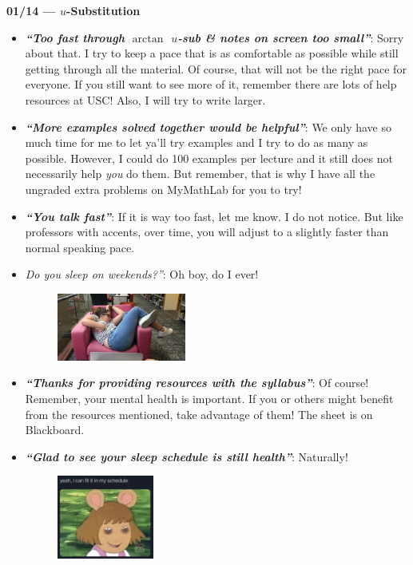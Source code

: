 \documentclass[11pt,letterpaper]{article}
\newcommand{\comment}[1]{{\itshape\bfseries ``#1''}:}
\begin{document}
\thispagestyle{title}

{\bfseries\large 01/14 --- $u$-Substitution}

\begin{itemize}
\item \comment{Too fast through $\arctan$ $u$-sub \& notes on screen too small} Sorry about that. I try to keep a pace that is as comfortable as possible while still getting through all the material. Of course, that will not be the right pace for everyone. If you still want to see more of it, remember there are lots of help resources at USC! Also, I will try to write larger.
\item \comment{More examples solved together would be helpful} We only have so much time for me to let ya'll try examples and I try to do as many as possible. However, I could do 100 examples per lecture and it still does not necessarily help \textit{you} do them. But remember, that is why I have all the ungraded extra problems on MyMathLab for you to try!
\item \comment{You talk fast} If it is way too fast, let me know. I do not notice. But like professors with accents, over time, you will adjust to a slightly faster than normal speaking pace.
\item {\itshape Do you sleep on weekends?''}: Oh boy, do I ever!
	\begin{figure}[ht]
	\centering
	\includegraphics[width=0.4\textwidth]{images/sleep.png}
	\end{figure}
\item \comment{Thanks for providing resources with the syllabus} Of course! Remember, your mental health is important. If you or others might benefit from the resources mentioned, take advantage of them! The sheet is on Blackboard.
\item \comment{Glad to see your sleep schedule is still health} Naturally!
	\begin{figure}[ht]
	\centering
	\includegraphics[width=0.3\textwidth]{images/dw.png}

\end{figure}
\end{itemize}
\end{document}
